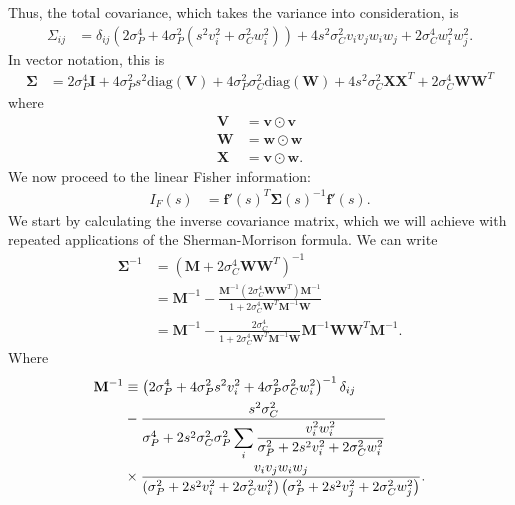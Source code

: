 \documentclass[12pt]{article}
\begin{document}
Thus, the total covariance, which takes the variance into consideration, is 
\begin{align}
	\Sigma_{ij} &= \delta_{ij} \left(2 \sigma_P^4 + 4\sigma_P^2 (s^2 v_i^2 + \sigma_C^2 w_i^2)\right) + 4 s^2 \sigma_C^2 v_i v_j w_i w_j + 2 \sigma_C^4 w_i^2 w_j^2.
\end{align}
In vector notation, this is 
\begin{align}
	\boldsymbol{\Sigma} &= 2\sigma_P^4 \mathbf{I} +4\sigma_P^2 s^2 \text{diag}(\mathbf{V}) + 4\sigma_P^2 \sigma_C^2 \text{diag}(\mathbf{W}) + 4s^2 \sigma_C^2 \mathbf{X}\mathbf{X}^T + 2 \sigma_C^4 \mathbf{W}\mathbf{W}^T
\end{align}
where
\begin{align}
	\mathbf{V} &= \mathbf{v} \odot \mathbf{v}\\
	\mathbf{W} &= \mathbf{w} \odot \mathbf{w}\\
	\mathbf{X} &= \mathbf{v} \odot \mathbf{w}.
\end{align}
We now proceed to the linear Fisher information:
\begin{align}
	I_F(s) &= \mathbf{f}'(s)^T \boldsymbol{\Sigma}(s)^{-1} \mathbf{f}'(s).
\end{align}
We start by calculating the inverse covariance matrix, which we will achieve with repeated applications of the Sherman-Morrison formula. We can write 
\begin{align}
	\boldsymbol{\Sigma}^{-1} &= (\mathbf{M} + 2\sigma_C^4 \mathbf{W}\mathbf{W}^T)^{-1} \\
	&= \mathbf{M}^{-1} - \frac{\mathbf{M}^{-1} (2\sigma_C^4 \mathbf{W}\mathbf{W}^T) \mathbf{M}^{-1}}{1 + 2\sigma_C^4 \mathbf{W}^T\mathbf{M}^{-1}\mathbf{W}} \\
	&= \mathbf{M}^{-1} - \frac{2\sigma_C^4}{1 + 2\sigma_C^4 \mathbf{W}^T\mathbf{M}^{-1} \mathbf{W}} \mathbf{M}^{-1}\mathbf{W}\mathbf{W}^T\mathbf{M}^{-1}.
\end{align}
Where
\begin{align}
\mathbf{M}^{-1} &\equiv  \left(2\sigma_P^4 + 4\sigma_P^2 s^2 v_i^2 + 4\sigma_P^2 \sigma_C^2 w_i^2\right)^{-1}\delta_{ij} \notag \\
&- \frac{s^2\sigma_C^2}{\sigma_P^4 +2s^2\sigma_C^2 \sigma_P^2\displaystyle\sum_i\frac{v_i^2 w_i^2}{\sigma_P^2+ 2s^2 v_i^2 + 2 \sigma_C^2 w_i^2}} \notag \\
&\times  \frac{v_i v_j w_i w_j}{\left(\sigma_P^2 + 2s^2 v_i^2 + 2 \sigma_C^2 w_i^2\right)\left(\sigma_P^2 + 2 s^2 v_j^2 + 2\sigma_C^2 w_j^2\right)}.
\end{align}
\end{document}
